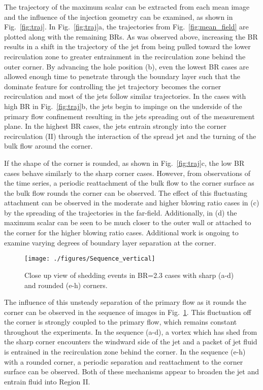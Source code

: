 \documentclass[10pt, twocolumn]{article}
\begin{document}
The trajectory of the maximum scalar can be extracted from each mean image and the influence of the injection geometry can be examined, as shown in Fig.~\ref{fig:traj}. In Fig.~\ref{fig:traj}a, the trajectories from Fig.~\ref{fig:mean_field} are plotted along with the remaining BRs. As was observed above, increasing the BR results in a shift in the trajectory of the jet from being pulled toward the lower recirculation zone to greater entrainment in the recirculation zone behind the outer corner. By advancing the hole position (b), even the lowest BR cases are allowed enough time to penetrate through the boundary layer such that the dominate feature for controlling the jet trajectory becomes the corner recirculation and most of the jets follow similar trajectories. In the cases with high BR in Fig.~\ref{fig:traj}b, the jets begin to impinge on the underside of the primary flow confinement resulting in the jets spreading out of the measurement plane. In the highest BR cases, the jets entrain strongly into the corner recirculation (II) through the interaction of the spread jet and the turning of the bulk flow around the corner.

If the shape of the corner is rounded, as shown in Fig.~\ref{fig:traj}c, the low BR cases behave similarly to the sharp corner cases. However, from observations of the time series, a periodic reattachment of the bulk flow to the corner surface as the bulk flow rounds the corner can be observed. The effect of this fluctuating attachment can be observed in the moderate and higher blowing ratio cases in (c) by the spreading of the trajectories in the far-field. Additionally, in (d) the maximum scalar can be seen to be much closer to the outer wall or attached to the corner for the higher blowing ratio cases. Additional work is ongoing to examine varying degrees of boundary layer separation at the corner.

\begin{figure}[t!]
	\centering
	\texttt{[image: ./figures/Sequence\_vertical]}
	\caption{Close up view of shedding events in BR=2.3 cases with sharp (a-d) and rounded (e-h) corners.}
	\label{fig:seq}
\end{figure}

The influence of this unsteady separation of the primary flow as it rounds the corner can be observed in the sequence of images in Fig.~\ref{fig:seq}. This fluctuation off the corner is strongly coupled to the primary flow, which remains constant throughout the experiments. In the sequence (a-d), a vortex which has shed from the sharp corner encounters the windward side of the jet and a packet of jet fluid is entrained in the recirculation zone behind the corner. In the sequence (e-h) with a rounded corner, a periodic separation and reattachment to the corner surface can be observed. Both of these mechanisms appear to broaden the jet and entrain fluid into Region II.
\end{document}
